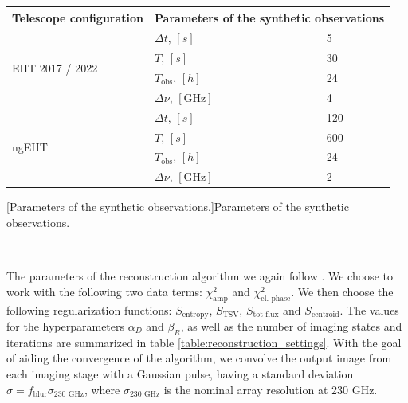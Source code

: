 \documentclass[12pt]{article}
\numberwithin{equation}{section}
\numberwithin{figure}{section}
\begin{document}
	\begin{minipage}{18em}
		\begin{center}
			\begin{tabular}{|| m{7.5em} | m{5em} | m{2em} ||}
				\hline 
				Telescope configuration & \multicolumn{2}{m{7em}||}{Parameters of the synthetic observations} \\
				\hline
				\multirow{4}{7.5em}{\centering \small EHT 2017 / 2022} &\centering $\Delta t,\, [s]$    		& 5   \\ 
				&\centering $T,\,[s]$ 		     		& 30  \\ 
				&\centering $T_\text{obs},\,[h]$ 		& 24  \\
				&\centering $\Delta \nu,\,[\text{GHz}]$ & 4 \\
				\hline
				\multirow{4}{7.5em}{\centering \small ngEHT} 		  & \centering $\Delta t,\, [s]$    	   & 120 \\ 
				& \centering $T,\,[s]$ 		      	   & 600 \\ 
				& \centering $T_\text{obs},\,[h]$ 	   & 24  \\
				& \centering $\Delta \nu,\,[\text{GHz}]$ & 2 \\
				\hline
			\end{tabular}
		\end{center}
		[Parameters of the synthetic observations.]{Parameters of the synthetic observations.}
		\label{table:ehtim_obs_settings}
	\end{minipage}\,\,
	\begin{minipage}{18em}
		
		The parameters of the reconstruction algorithm we again follow \cite{EHTIM}. We choose to work with the following two data terms: $\chi^2_\text{amp}$ and $\chi^2_\text{cl. phase}$. We then choose the following regularization functions: $S_\text{entropy}$, $S_\text{TSV}$, $S_\text{tot flux}$ and $S_\text{centroid}$. The values for the hyperparameters $\alpha_D$ and $\beta_R$, as well as the number of imaging states and iterations are summarized in table \ref{table:reconstruction_settings}. With the goal of aiding the convergence of the algorithm, we convolve the output image from each imaging stage with a Gaussian pulse, having a standard deviation $\sigma = f_\text{blur} \sigma_{\text{230 GHz}}$, where $\sigma_{\text{230 GHz}}$ is the nominal array resolution at 230 GHz.
	\end{minipage}
	
\end{document}
